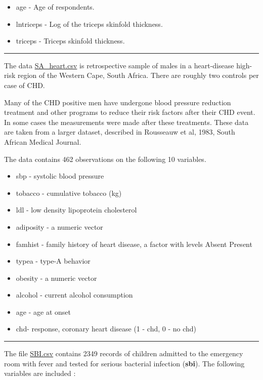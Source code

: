 \documentclass[
]{book}
\providecommand{\tightlist}{%
  \setlength{\itemsep}{0pt}\setlength{\parskip}{0pt}}
\begin{document}
\begin{itemize}
\tightlist
\item
  age - Age of respondents.
\item
  lntriceps - Log of the triceps skinfold thickness.
\item
  triceps - Triceps skinfold thickness.
\end{itemize}

\begin{center}\rule{0.5\linewidth}{0.5pt}\end{center}

The data \href{https://www.dropbox.com/s/cwkw3p91zyizcqz/SA_heart.csv?dl=1}{SA\_heart.csv}
is retrospective sample of males in a heart-disease high-risk region of the
Western Cape, South Africa. There are roughly two controls per case of CHD.

Many of the CHD positive men have undergone blood pressure
reduction treatment and other programs to reduce their risk factors after
their CHD event. In some cases the measurements were made after these
treatments. These data are taken from a larger dataset,
described in Rousseauw et al, 1983, South African Medical Journal.

The data contains 462 observations on the following 10 variables.

\begin{itemize}
\tightlist
\item
  sbp - systolic blood pressure
\item
  tobacco - cumulative tobacco (kg)
\item
  ldl - low density lipoprotein cholesterol
\item
  adiposity - a numeric vector
\item
  famhist - family history of heart disease, a factor
  with levels Absent Present
\item
  typea - type-A behavior
\item
  obesity - a numeric vector
\item
  alcohol - current alcohol consumption
\item
  age - age at onset
\item
  chd- response, coronary heart disease (1 - chd, 0 - no chd)
\end{itemize}

\begin{center}\rule{0.5\linewidth}{0.5pt}\end{center}

The file \href{https://www.dropbox.com/s/da3by5vuzkv77xi/SBI.csv?dl=1}{SBI.csv}
contains 2349 records of children admitted to the emergency room
with fever and tested for serious bacterial infection (\textbf{sbi}). The following
variables are included :
\end{document}
